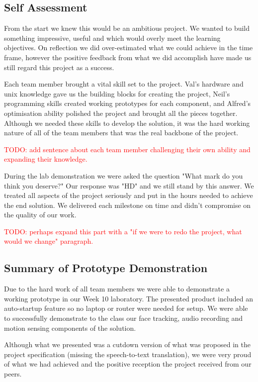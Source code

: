 \documentclass[11pt,a4paper,titlepage]{report}
\begin{document}
\subsection{Self Assessment}

From the start we knew this would be an ambitious project. We wanted to build something impressive, useful and which would overly meet the learning objectives. On reflection we did over-estimated what we could achieve in the time frame, however the positive feedback from what we did accomplish have made us still regard this project as a success.

Each team member brought a vital skill set to the project. Val's hardware and unix knowledge gave us the building blocks for creating the project, Neil's programming skills created working prototypes for each component, and Alfred's optimisation ability polished the project and brought all the pieces together. Although we needed these skills to develop the solution, it was the hard working nature of all of the team members that was the real backbone of the project.

\textcolor{red}{TODO: add sentence about each team member challenging their own ability and expanding their knowledge.}


During the lab demonstration we were asked the question "What mark do you think you deserve?" Our response was "HD" and we still stand by this answer. We treated all aspects of the project seriously and put in the hours needed to achieve the end solution. We delivered each milestone on time and didn't compromise on the quality of our work.

\textcolor{red}{TODO: perhaps expand this part with a "if we were to redo the project, what would we change" paragraph.}

\subsection{Summary of Prototype Demonstration}

Due to the hard work of all team members we were able to demonstrate a working prototype in our Week 10 laboratory. The presented product included an auto-startup feature so no laptop or router were needed for setup. We were able to successfully demonstrate to the class our face tracking, audio recording and motion sensing components of the solution. 

Although what we presented was a cutdown version of what was proposed in the project specification (missing the speech-to-text translation), we were very proud of what we had achieved and the positive reception the project received from our peers.
\end{document}
